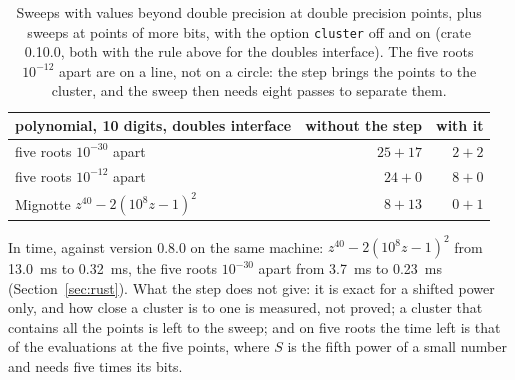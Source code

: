 \documentclass[10pt,a4paper]{article}
\theoremstyle{definition}
\numberwithin{equation}{section}
\begin{document}
\begin{table}[H]\centering\small
\begin{tabular}{lrr}
\toprule
polynomial, 10 digits, doubles interface & without the step & with it\\
\midrule
five roots $10^{-30}$ apart & $25+17$ & $2+2$\\
five roots $10^{-12}$ apart & $24+0$ & $8+0$\\
Mignotte $z^{40}-2(10^8z-1)^2$ & $8+13$ & $0+1$\\
\bottomrule
\end{tabular}
\caption{Sweeps with values beyond double precision at double precision points, plus sweeps at points of
more bits, with the option \texttt{cluster} off and on (crate 0.10.0, both with the rule above for the
doubles interface). The five roots $10^{-12}$ apart are on a
line, not on a circle: the step brings the points to the cluster, and the sweep then needs eight passes to
separate them.}\label{tab:cluster}
\end{table}
In time, against version 0.8.0 on the same machine: $z^{40}-2(10^8z-1)^2$ from 13.0~ms to 0.32~ms, the
five roots $10^{-30}$ apart from 3.7~ms to 0.23~ms (Section~\ref{sec:rust}). What the step does not give:
it is exact for a shifted power only, and how close a cluster is to one is measured, not proved; a cluster
that contains all the points is left to the sweep; and on five roots the time left is that of the
evaluations at the five points, where $S$ is the fifth power of a small number and needs five times its
bits.
\end{document}
